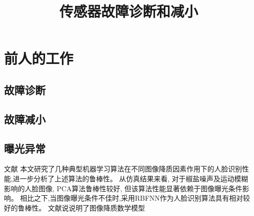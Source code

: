 \documentclass{amsart}
\title{传感器故障诊断和减小}
\author{}
\date{}
\begin{document}
\maketitle
\tableofcontents

\section{前人的工作}

\subsection{故障诊断}
\subsection{故障减小}
\subsection{曝光异常}
文献 \cite{liliming} 本文研究了几种典型机器学习算法在不同图像降质因素作用下的人脸识别性能,进一步分析了上述算法的鲁棒性。
从仿真结果来看,
对于椒盐噪声及运动模糊影响的人脸图像,
PCA算法鲁棒性较好,
但该算法性能显著依赖于图像曝光条件影响。
相比之下,当图像曝光条件不佳时,采用RBFNN作为人脸识别算法具有相对较好的鲁棒性。
文献说说明了图像降质数学模型
\end{document}
